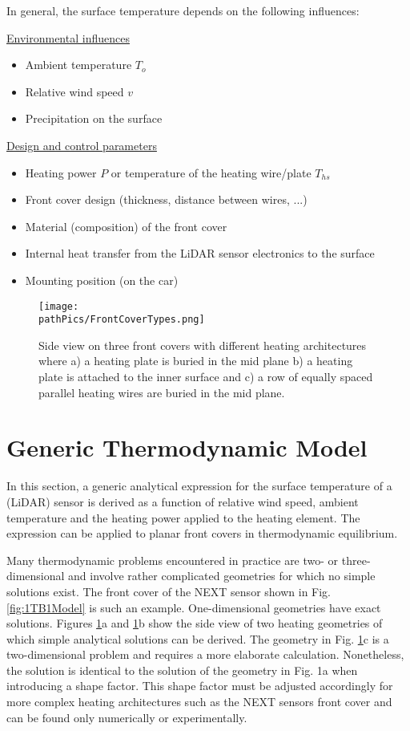 In general, the surface temperature depends on the following influences:

\underline{Environmental influences}
\begin{itemize}
\item Ambient temperature \(T_{o}\)
\item Relative wind speed \(v\)
\item Precipitation on the surface
\end{itemize}

\underline{Design and control parameters}
\begin{itemize}
\item Heating power \(P\) or temperature of the heating wire/plate \(T_{hs}\)
\item Front cover design (thickness, distance between wires, ...)
\item Material (composition) of the front cover
\item Internal heat transfer from the LiDAR sensor electronics to the surface
\item Mounting position (on the car)
\end{itemize}

\begin{figure} [H]
	\centering
	\texttt{[image: \\pathPics/FrontCoverTypes.png]}

	\caption[Heating Architectures]{Side view on three front covers with different heating architectures where a) a heating plate is buried in the mid plane b) a heating plate is attached to the inner surface and c) a row of equally spaced parallel heating wires are buried in the mid plane.}
	\label{fig:examples}
\end{figure}


\section{Generic Thermodynamic Model}
In this section, a generic analytical expression for the surface temperature of a (LiDAR) sensor is derived as a function of relative wind speed, ambient temperature and the heating power applied to the heating element. The expression can be applied to planar front covers in thermodynamic equilibrium. 

Many thermodynamic problems encountered in practice are two- or three-dimensional and involve rather complicated geometries for which no simple solutions exist. The front cover of the NEXT sensor shown in Fig. \ref{fig:1TB1Model} is such an example. One-dimensional geometries have exact solutions. Figures \ref{fig:examples}a and \ref{fig:examples}b show the side view of two heating geometries of which simple analytical solutions can be derived. The geometry in Fig. \ref{fig:examples}c is a two-dimensional problem and requires a more elaborate calculation. Nonetheless, the solution is identical to the solution of the geometry in Fig. 1a when introducing a shape factor. This shape factor must be adjusted accordingly for more complex heating architectures such as the NEXT sensors front cover and can be found only numerically or experimentally. 

